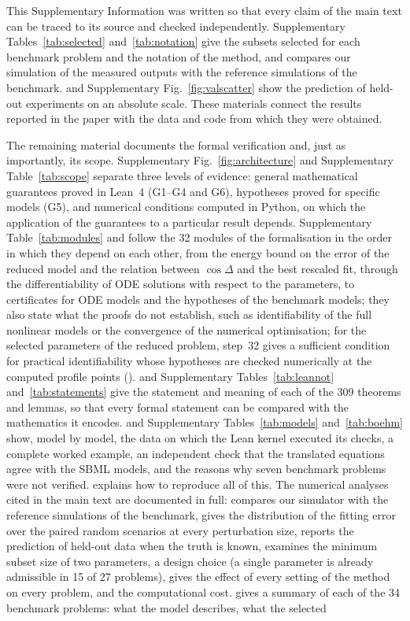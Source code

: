 
This Supplementary Information was written so that every claim of the main text can be traced to its source and checked independently. Supplementary Tables~\ref{tab:selected} and~\ref{tab:notation} give the subsets selected for each benchmark problem and the notation of the method, and  compares our simulation of the measured outputs with the reference simulations of the benchmark.  and Supplementary Fig.~\ref{fig:valscatter} show the prediction of held-out experiments on an absolute scale. These materials connect the results reported in the paper with the data and code from which they were obtained.

The remaining material documents the formal verification and, just as importantly, its scope. Supplementary Fig.~\ref{fig:architecture} and Supplementary Table~\ref{tab:scope} separate three levels of evidence: general mathematical guarantees proved in Lean~4 (G1--G4 and G6), hypotheses proved for specific models (G5), and numerical conditions computed in Python, on which the application of the guarantees to a particular result depends. Supplementary Table~\ref{tab:modules} and  follow the 32 modules of the formalisation in the order in which they depend on each other, from the energy bound on the error of the reduced model and the relation between $\cos\Delta$ and the best rescaled fit, through the differentiability of ODE solutions with respect to the parameters, to certificates for ODE models and the hypotheses of the benchmark models; they also state what the proofs do not establish, such as identifiability of the full nonlinear models or the convergence of the numerical optimisation; for the selected parameters of the reduced problem, step~32 gives a sufficient condition for practical identifiability whose hypotheses are checked numerically at the computed profile points ().  and Supplementary Tables~\ref{tab:leannot} and~\ref{tab:statements} give the statement and meaning of each of the 309 theorems and lemmas, so that every formal statement can be compared with the mathematics it encodes.  and Supplementary Tables~\ref{tab:models} and~\ref{tab:boehm} show, model by model, the data on which the Lean kernel executed its checks, a complete worked example, an independent check that the translated equations agree with the SBML models, and the reasons why seven benchmark problems were not verified.  explains how to reproduce all of this. The numerical analyses cited in the main text are documented in full:  compares our simulator with the reference simulations of the benchmark,  gives the distribution of the fitting error over the paired random scenarios at every perturbation size,  reports the prediction of held-out data when the truth is known,  examines the minimum subset size of two parameters, a design choice (a single parameter is already admissible in 15 of 27 problems),  gives the effect of every setting of the method on every problem, and  the computational cost.  gives a summary of each of the 34 benchmark problems: what the model describes, what the selected 